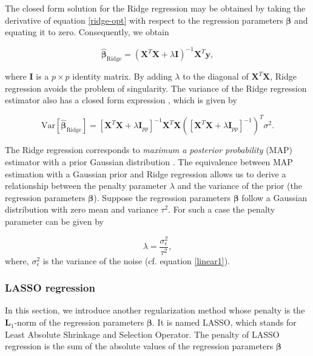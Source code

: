 \documentclass[a4paper]{article}
\begin{document}
The closed form solution for the Ridge regression may be obtained by taking the derivative of equation \ref{ridge-opt} with respect to the regression parameters $\boldsymbol{\beta}$ and equating it to zero. Consequently, we obtain

\begin{equation}
    \hat{\boldsymbol{\beta}}_{\text{Ridge}}= (\mathbf{X}^T\mathbf{X}+\lambda \mathbf{I})^{-1}\mathbf{X}^T \mathbf{y},
    \label{eqn_Ridge}
\end{equation}


where $\boldsymbol{I}$ is a $p\times p$ identity matrix. By adding $\lambda$ to the diagonal of $\mathbf{X}^T\mathbf{X}$, Ridge regression avoids the problem of singularity. The variance of the Ridge regression estimator also has a closed form expression \cite{regression}, which is given by

\begin{equation}
    \text{Var}[\hat{\boldsymbol{\beta}}_{\text{Ridge}}] = [\mathbf{X}^T\mathbf{X}+\lambda\mathbf{I}_{pp}]^{-1}\mathbf{X}^T\mathbf{X}
    ([\mathbf{X}^T\mathbf{X}+\lambda\mathbf{I}_{pp}]^{-1})^T{\sigma}^2.
    \label{eqn_Ridge_var}
\end{equation}

The Ridge regression corresponds to \textit{maximum a posterior probability} (MAP) estimator with a prior Gaussian distribution \cite{Pankaj}. The equivalence
between MAP estimation with a Gaussian prior
and Ridge regression allows us to derive a relationship between the penalty parameter $\lambda$ and the variance of the prior (the regression parameters $\boldsymbol{\beta}$). Suppose the regression parameters $\boldsymbol{\beta}$ follow a Gaussian distribution with zero mean and variance $\tau^2$. For such a case the penalty parameter can be given by

\begin{equation}
    \lambda = \frac{\sigma_{\epsilon}^2}{\tau^2},
    \label{lambda-var}
\end{equation}
where, $\sigma_{\epsilon}^2$ is the variance of the noise (cf. equation \ref{linear1}).

\subsubsection{LASSO regression}
In this section, we introduce another regularization method whose penalty is the $\mathbf{L}_1$-norm of the regression parameters $\boldsymbol{\beta}$. It is named LASSO, which stands for Least Absolute Shrinkage and Selection Operator. The penalty of LASSO regression is the sum of the absolute values of the regression parameters $\boldsymbol{\beta}$ 
\end{document}
